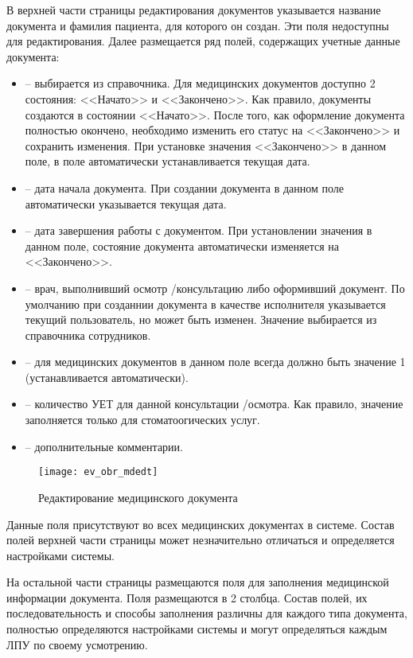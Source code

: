 В верхней части страницы редактирования документов указывается название документа и фамилия пациента, для которого он создан. Эти поля недоступны для редактирования. Далее размещается ряд полей, содержащих учетные данные документа: 
\begin{itemize}
 \item {} -- выбирается из справочника. Для медицинских документов доступно 2 состояния: <<Начато>> и <<Закончено>>. Как правило, документы создаются в состоянии <<Начато>>. После того, как оформление документа полностью окончено, необходимо изменить его статус на <<Закончено>> и сохранить изменения. При установке значения <<Закончено>> в данном поле, в поле  автоматически устанавливается текущая дата. 
 \item {} -- дата начала документа. При создании документа в данном поле автоматически указывается текущая дата.
 \item {} -- дата завершения работы с документом. При установлении значения в данном поле, состояние документа автоматически изменяется на <<Закончено>>. 
 \item {} -- врач, выполнивший осмотр \slash консультацию либо оформивший документ. По умолчанию при созданнии документа в качестве исполнителя указывается текущий пользователь, но может быть изменен. Значение выбирается из справочника сотрудников. 
 \item {} -- для медицинских документов в данном поле всегда должно быть значение 1 (устанавливается автоматически).
 \item {} -- количество УЕТ для данной консультации \slash осмотра. Как правило, значение заполняется только для стоматоогических услуг.
 \item {} -- дополнительные комментарии.
\end{itemize}

\begin{figure}[ht]\centering
 \texttt{[image: ev\_obr\_mdedt]}
 \caption{Редактирование медицинского документа}
 \label{img_ev_obr_mdedt}
\end{figure}

Данные поля присутствуют во всех медицинских документах в системе. Состав полей верхней части страницы может незначительно отличаться и определяется настройками системы.

На остальной части страницы размещаются поля для заполнения медицинской информации документа. Поля размещаются в 2 столбца. Состав полей, их последовательность и способы заполнения различны для каждого типа документа, полностью определяются настройками системы и могут определяться каждым ЛПУ по своему усмотрению.  

